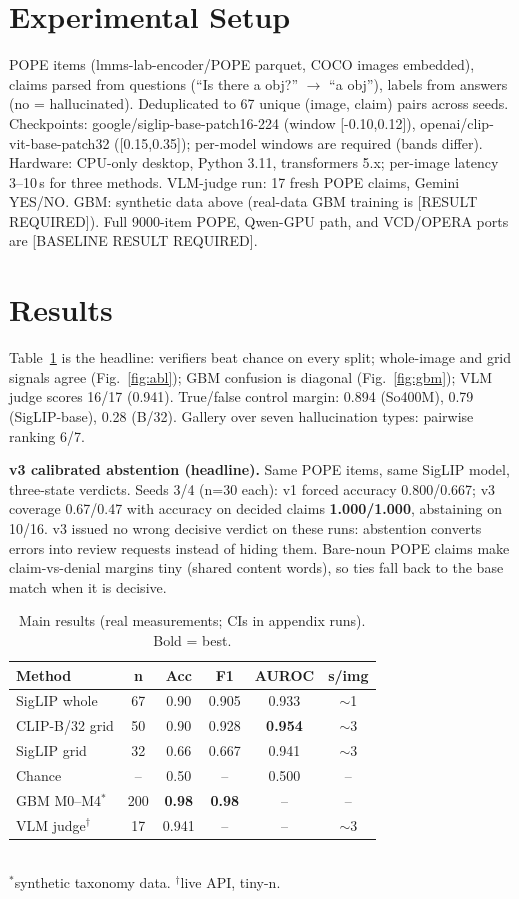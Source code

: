 \documentclass[conference]{IEEEtran}
\begin{document}
\section{Experimental Setup}
POPE items (lmms-lab-encoder/POPE parquet, COCO images embedded), claims parsed
from questions (``Is there a {obj}?'' $\rightarrow$ ``a {obj}''), labels from
answers (no = hallucinated). Deduplicated to 67 unique (image, claim) pairs
across seeds. Checkpoints: google/siglip-base-patch16-224 (window
[-0.10,0.12]), openai/clip-vit-base-patch32 ([0.15,0.35]); per-model windows
are required (bands differ). Hardware: CPU-only desktop, Python 3.11,
transformers 5.x; per-image latency 3--10\,s for three methods. VLM-judge run:
17 fresh POPE claims, Gemini YES/NO. GBM: synthetic data above (real-data GBM
training is [RESULT REQUIRED]). Full 9000-item POPE, Qwen-GPU path, and
VCD/OPERA ports are [BASELINE RESULT REQUIRED].

\section{Results}
Table~\ref{tab:main} is the headline: verifiers beat chance on every split;
whole-image and grid signals agree (Fig.~\ref{fig:abl}); GBM confusion is
diagonal (Fig.~\ref{fig:gbm}); VLM judge scores 16/17 (0.941). True/false
control margin: 0.894 (So400M), 0.79 (SigLIP-base), 0.28 (B/32). Gallery over
seven hallucination types: pairwise ranking 6/7.

\textbf{v3 calibrated abstention (headline).} Same POPE items, same SigLIP
model, three-state verdicts. Seeds 3/4 (n=30 each): v1 forced accuracy
0.800/0.667; v3 coverage 0.67/0.47 with accuracy on decided claims
\textbf{1.000/1.000}, abstaining on 10/16. v3 issued no wrong decisive verdict
on these runs: abstention converts errors into review requests instead of
hiding them. Bare-noun POPE claims make claim-vs-denial margins tiny (shared
content words), so ties fall back to the base match when it is decisive.

\begin{table}[htbp]
\caption{Main results (real measurements; CIs in appendix runs). Bold = best.}
\label{tab:main}
\centering
\begin{tabular}{lccccc}
\toprule
Method & n & Acc & F1 & AUROC & s/img \\
\midrule
SigLIP whole & 67 & 0.90 & 0.905 & 0.933 & $\sim$1 \\
CLIP-B/32 grid & 50 & 0.90 & 0.928 & \textbf{0.954} & $\sim$3 \\
SigLIP grid & 32 & 0.66 & 0.667 & 0.941 & $\sim$3 \\
Chance & -- & 0.50 & -- & 0.500 & -- \\
GBM M0--M4$^*$ & 200 & \textbf{0.98} & \textbf{0.98} & -- & -- \\
VLM judge$^\dagger$ & 17 & 0.941 & -- & -- & $\sim$3 \\
\bottomrule
\end{tabular}
\\{\footnotesize $^*$synthetic taxonomy data. $^\dagger$live API, tiny-n.}
\end{table}
\end{document}
